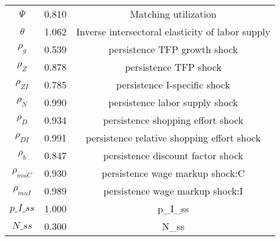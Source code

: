 \begin{center}
\begin{longtable}{ccc}
${\Psi}$ 	 & 	 0.810 	 & 	 Matching utilization\\
${\theta}$ 	 & 	 1.062 	 & 	 Inverse intersectoral elasticity of labor supply\\
${\rho_g}$ 	 & 	 0.539 	 & 	 persistence TFP growth shock\\
${\rho_Z}$ 	 & 	 0.878 	 & 	 persistence TFP shock\\
${\rho_{ZI}}$ 	 & 	 0.785 	 & 	 persistence I-specific shock\\
${\rho_N}$ 	 & 	 0.990 	 & 	 persistence labor supply shock\\
${\rho_D}$ 	 & 	 0.934 	 & 	 persistence shopping effort shock\\
${\rho_{DI}}$ 	 & 	 0.991 	 & 	 persistence relative shopping effort shock\\
${\rho_b}$ 	 & 	 0.847 	 & 	 persistence discount factor shock\\
${\rho_{muC}}$ 	 & 	 0.930 	 & 	 persistence wage markup shock:C\\
${\rho_{muI}}$ 	 & 	 0.989 	 & 	 persistence wage markup shock:I\\
$p\_I\_ss$ 	 & 	 1.000 	 & 	 p\_I\_ss\\
$N\_ss$ 	 & 	 0.300 	 & 	 N\_ss\\
\bottomrule%
\end{longtable}
\end{center}
